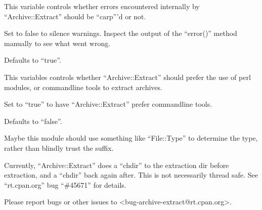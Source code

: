 \documentclass[]{article}
\begin{document}
This variable controls whether errors encountered internally by
``Archive::Extract'' should be ``carp'''d or not.

Set to false to silence warnings. Inspect the output of the ``error()''
method manually to see what went wrong.

Defaults to ``true''.


This variables controls whether ``Archive::Extract'' should prefer the
use of perl modules, or commandline tools to extract archives.

Set to ``true'' to have ``Archive::Extract'' prefer commandline tools.

Defaults to ``false''.


\begin{description}
\itemsep1pt\parskip0pt
\item[Mime magic support]
Maybe this module should use something like ``File::Type'' to determine
the type, rather than blindly trust the suffix.
\end{description}

\begin{description}
\itemsep1pt\parskip0pt
\item[Thread safety]
Currently, ``Archive::Extract'' does a ``chdir'' to the extraction dir
before extraction, and a ``chdir'' back again after. This is not
necessarily thread safe. See ``rt.cpan.org'' bug ``\#45671'' for
details.
\end{description}


Please report bugs or other issues to
\textless{}bug-archive-extract@rt.cpan.org\textgreater{}.
\end{document}
